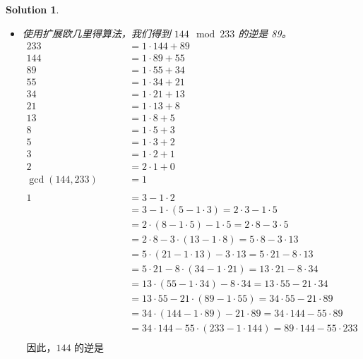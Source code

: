 \documentclass[UTF8]{report}
\newtheorem{solution}{Solution}
\theoremstyle{MyLineTheoremStyle} %
\theoremstyle{MyBlockTheoremStyle} %
\theoremstyle{MySubsubsectionStyle} %
\begin{document}
\begin{solution}
\begin{itemize}
        \item[c)] 使用扩展欧几里得算法，我们得到 \( 144 \mod 233 \) 的逆是 89。
        \[
        \begin{aligned}
            233 &= 1 \cdot 144 + 89 \\
            144 &= 1 \cdot 89 + 55 \\
            89 &= 1 \cdot 55 + 34 \\
            55 &= 1 \cdot 34 + 21 \\
            34 &= 1 \cdot 21 + 13 \\
            21 &= 1 \cdot 13 + 8 \\
            13 &= 1 \cdot 8 + 5 \\
            8 &= 1 \cdot 5 + 3 \\
            5 &= 1 \cdot 3 + 2 \\
            3 &= 1 \cdot 2 + 1 \\
            2 &= 2 \cdot 1 + 0 \\
            \gcd(144, 233) &= 1 \\
            \\
            1 &= 3 - 1 \cdot 2 \\
              &= 3 - 1 \cdot (5 - 1 \cdot 3) = 2 \cdot 3 - 1 \cdot 5 \\
              &= 2 \cdot (8 - 1 \cdot 5) - 1 \cdot 5 = 2 \cdot 8 - 3 \cdot 5 \\
              &= 2 \cdot 8 - 3 \cdot (13 - 1 \cdot 8) = 5 \cdot 8 - 3 \cdot 13 \\
              &= 5 \cdot (21 - 1 \cdot 13) - 3 \cdot 13 = 5 \cdot 21 - 8 \cdot 13 \\
              &= 5 \cdot 21 - 8 \cdot (34 - 1 \cdot 21) = 13 \cdot 21 - 8 \cdot 34 \\
              &= 13 \cdot (55 - 1 \cdot 34) - 8 \cdot 34 = 13 \cdot 55 - 21 \cdot 34 \\
              &= 13 \cdot 55 - 21 \cdot (89 - 1 \cdot 55) = 34 \cdot 55 - 21 \cdot 89 \\
              &= 34 \cdot (144 - 1 \cdot 89) - 21 \cdot 89 = 34 \cdot 144 - 55 \cdot 89 \\
              &= 34 \cdot 144 - 55 \cdot (233 - 1 \cdot 144) = 89 \cdot 144 - 55 \cdot 233 \\
            \\
            \text{因此，144 的逆是 89。}
        \end{aligned}
        \]


\end{itemize}
\end{solution}
\end{document}
